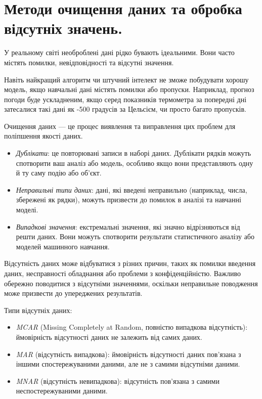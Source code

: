 \section{Методи очищення даних та обробка відсутніх значень.}

У реальному світі необроблені дані рідко бувають ідеальними. Вони часто містять помилки, 
невідповідності та відсутні значення. 

Навіть найкращий алгоритм чи штучний інтелект не зможе побудувати хорошу модель, якщо навчальні дані 
містять помилки або пропуски. Наприклад, прогноз погоди буде ускладненим, якщо серед показників 
термометра за попередні дні затесалися 
такі дані як -500 градусів за Цельсієм, чи просто багато пропусків.

Очищення даних — це процес виявлення та виправлення 
цих проблем для поліпшення якості даних.

\begin{itemize}
\item \textit{Дублікати}: це повторювані записи в наборі даних. Дублікати рядків можуть спотворити 
ваш аналіз або модель, особливо якщо вони представляють одну й ту саму подію або об'єкт.
\item \textit{Неправильні типи даних}: дані, які введені неправильно (наприклад, числа, збережені як 
рядки), можуть призвести до помилок в аналізі та навчанні моделі.
\item \textit{Випадкові значення}: екстремальні значення, які значно відрізняються від решти даних. 
Вони можуть спотворити результати статистичного аналізу або моделей машинного навчання.
\end{itemize}

Відсутність даних може відбуватися з різних причин, таких як помилки введення даних, 
несправності обладнання або проблеми з конфіденційністю. Важливо обережно поводитися 
з відсутніми значеннями, оскільки неправильне поводження може призвести до упереджених 
результатів.

Типи відсутніх даних:

\begin{itemize}
\item \textit{MCAR} (Missing Completely at Random, повністю випадкова відсутність): ймовірність 
відсутності даних не залежить від самих даних.
\item \textit{MAR} (відсутність випадкова): ймовірність відсутності даних пов'язана з іншими 
спостережуваними даними, але не з самими відсутніми даними.
\item \textit{MNAR} (відсутність невипадкова): відсутність пов'язана з самими неспостережуваними 
даними.
\end{itemize}



